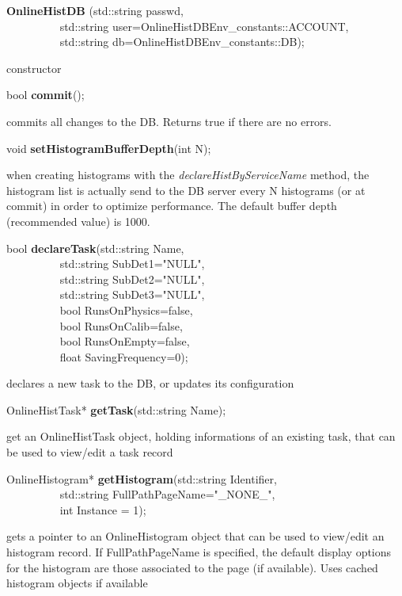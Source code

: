 \item    {\bf OnlineHistDB }(std::string passwd,\\\mbox{}~~~~~~~~~ 
		std::string user=OnlineHistDBEnv\_constants::ACCOUNT,\\\mbox{}~~~~~~~~~ 
		std::string db=OnlineHistDBEnv\_constants::DB);

 constructor


\item    bool {\bf commit}();


 commits all changes to the DB. Returns true if there are no errors.


\item    void {\bf setHistogramBufferDepth}(int N);


 when creating histograms with the {\it declareHistByServiceName}
 method, the histogram list is actually send to the DB server every N
 histograms (or at commit) in order to optimize performance. The
 default buffer depth (recommended value) is 1000. 


\item    bool {\bf declareTask}(std::string Name,\\\mbox{}~~~~~~~~~ 
		   std::string SubDet1="NULL",\\\mbox{}~~~~~~~~~ 
		   std::string SubDet2="NULL",\\\mbox{}~~~~~~~~~ 
		   std::string SubDet3="NULL",\\\mbox{}~~~~~~~~~
		   bool RunsOnPhysics=false,\\\mbox{}~~~~~~~~~ 
		   bool RunsOnCalib=false,\\\mbox{}~~~~~~~~~ 
		   bool RunsOnEmpty=false,\\\mbox{}~~~~~~~~~
		   float SavingFrequency=0);

 declares a new task to the DB, or updates its configuration 


\item    OnlineHistTask* {\bf getTask}(std::string Name);


 get an OnlineHistTask object, holding informations of an existing task, that can be used to view/edit a task record


\item    OnlineHistogram* {\bf getHistogram}(std::string Identifier,\\\mbox{}~~~~~~~~~
				std::string FullPathPageName="\_NONE\_",\\\mbox{}~~~~~~~~~
				int Instance = 1);

 gets a pointer to an OnlineHistogram object that can be used to view/edit an histogram record. If FullPathPageName
 is specified, the default display options for the histogram are those associated to the page (if available).
 Uses cached histogram objects if available


